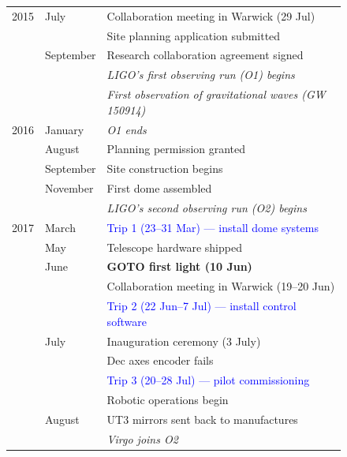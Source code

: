 \begin{colsection}
\begin{colsection}
\begin{figure}[p]
    \begin{center}
        \begin{tabular}{cl|@{\tls}l} %
            2015 & July      & Collaboration meeting in Warwick (29 Jul) \\
                 &           & Site planning application submitted \\
                 & September & Research collaboration agreement signed \\
                 &           & \textit{LIGO's first observing run (O1) begins} \\
                 &           & \textit{First observation of gravitational waves (GW 150914)} \\
            \midrule
            2016 & January   & \textit{O1 ends} \\
                 & August    & Planning permission granted \\
                 & September & Site construction begins \\
                 & November  & First dome assembled \\
                 &           & \textit{LIGO's second observing run (O2) begins} \\
            \midrule
            2017 & March     & \textcolor{Blue}{Trip 1 (23--31 Mar) --- install dome systems} \\
                 & May       & Telescope hardware shipped \\
                 & June      & \textbf{GOTO first light (10 Jun)} \\
                 &           & Collaboration meeting in Warwick (19--20 Jun) \\
                 &           & \textcolor{Blue}{Trip 2 (22 Jun--7 Jul) --- install control software} \\
                 & July      & Inauguration ceremony (3 July) \\
                 &           & Dec axes encoder fails \\
                 &           & \textcolor{Blue}{Trip 3 (20--28 Jul) --- pilot commissioning} \\
                 &           & Robotic operations begin \\
                 & August    & UT3 mirrors sent back to manufactures \\
                 &           & \textit{Virgo joins O2} \\

\end{tabular}
\end{center}
\end{figure}
\end{colsection}
\end{colsection}
